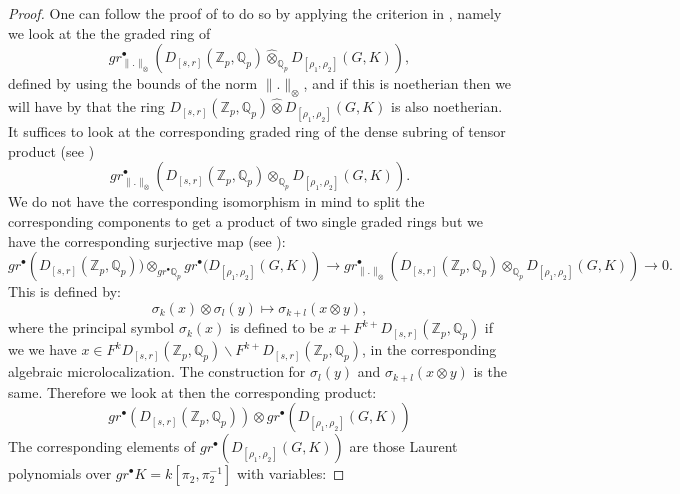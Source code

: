 \documentclass[12pt]{amsart}
\theoremstyle{definition}
\numberwithin{equation}{section}
\begin{document}
\begin{proof}
One can follow the proof of \cite[Proposition 4.1]{Zab1} to do so by applying the criterion in \cite[Proposition I.7.1.2]{LVO}, namely we look at the the graded ring of 
\begin{displaymath}
gr^\bullet_{\|.\|_{\otimes}} \left(D_{[s,r]}(\mathbb{Z}_p,\mathbb{Q}_p)\widehat{\otimes}_{\mathbb{Q}_p}D_{[\rho_1,\rho_2]}(G,K)\right),	
\end{displaymath}
defined by using the bounds of the norm $\|.\|_{\otimes}$, and if this is noetherian then we will have by \cite[Proposition I.7.1.2]{LVO} that the ring $D_{[s,r]}(\mathbb{Z}_p,\mathbb{Q}_p)\widehat{\otimes}D_{[\rho_1,\rho_2]}(G,K)$ is also noetherian. 
It suffices to look at the corresponding graded ring of the dense subring of tensor product (see \cite[Lemma 4.3]{ST1}) 
\begin{displaymath}
gr^\bullet_{\|.\|_{\otimes}} \left(D_{[s,r]}(\mathbb{Z}_p,\mathbb{Q}_p)\otimes_{\mathbb{Q}_p} D_{[\rho_1,\rho_2]}(G,K)\right).	
\end{displaymath}
We do not have the corresponding isomorphism in mind to split the corresponding components to get a product of two single graded rings but we have the corresponding surjective map (see \cite[I.6.13]{LVO}):
\begin{displaymath}
gr^\bullet \left(D_{[s,r]}(\mathbb{Z}_p,\mathbb{Q}_p))\otimes_{gr^\bullet \mathbb{Q}_p} gr^\bullet( D_{[\rho_1,\rho_2]}(G,K)\right)\rightarrow gr_{\|.\|_{\otimes}}^\bullet \left(D_{[s,r]}(\mathbb{Z}_p,\mathbb{Q}_p)\otimes_{\mathbb{Q}_p} D_{[\rho_1,\rho_2]}(G,K)\right)\rightarrow 0.	
\end{displaymath}
This is defined by:
\begin{displaymath}
\sigma_k(x)\otimes \sigma_l(y)\mapsto \sigma_{k+l}(x\otimes y),	
\end{displaymath}
where the principal symbol $\sigma_k(x)$ is defined to be $x+F^{k+} D_{[s,r]}(\mathbb{Z}_p,\mathbb{Q}_p)$ if we we have $x\in F^k D_{[s,r]}(\mathbb{Z}_p,\mathbb{Q}_p) \backslash F^{k+} D_{[s,r]}(\mathbb{Z}_p,\mathbb{Q}_p)$, in the corresponding algebraic microlocalization. The construction for $\sigma_l(y)$ and $ \sigma_{k+l}(x\otimes y)$ is the same. Therefore we look at then the corresponding product:
\begin{displaymath}
gr^\bullet \left(D_{[s,r]}(\mathbb{Z}_p,\mathbb{Q}_p)\right)\otimes gr^\bullet \left( D_{[\rho_1,\rho_2]}(G,K)\right)	
\end{displaymath}
The corresponding elements of $gr^\bullet \left( D_{[\rho_1,\rho_2]}(G,K)\right)$ are those Laurent polynomials over $gr^\bullet K=k[\pi_2,\pi_2^{-1}]$ with variables:

\end{proof}
\end{document}

